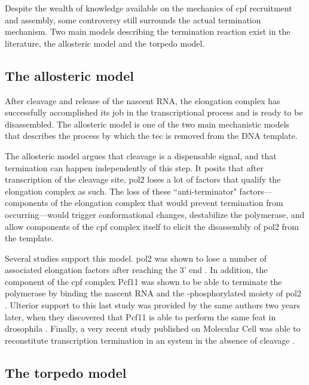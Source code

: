 Despite the wealth of knowledge available on the mechanics of \gls{cpf} recruitment and assembly, some controversy still surrounds the actual termination mechanism.
Two main models describing the termination reaction exist in the literature, the allosteric model and the torpedo model.

\subsection{The allosteric model}

After cleavage and release of the nascent RNA, the elongation complex has successfully accomplished its job in the transcriptional process and is ready to be disassembled.
The allosteric model is one of the two main mechanistic models that describes the process by which the \gls{tec} is removed from the DNA template.

The allosteric model argues that cleavage is a dispensable signal, and that termination can happen independently of this step.
It posits that after transcription of the cleavage site, \gls{pol2} loses a lot of factors that qualify the elongation complex as such.
The loss of these ``anti-terminator" factors---components of the elongation complex that would prevent termination from occurring---would trigger conformational changes, destabilize the polymerase, and allow components of the \gls{cpf} complex itself to elicit the disassembly of \gls{pol2} from the template.

Several studies support this model. 
\gls{pol2} was shown to lose a number of associated elongation factors after reaching the 3' end \citep{kim:2004:transitions}.
In addition, the component of the \gls{cpf} complex Pcf11 was shown to be able to terminate the polymerase \invitro{} by binding the nascent RNA and the \sert{}-phosphorylated moiety of \gls{pol2} \citep{zhang:2005:ctddependent}.
Ulterior support to this last study was provided by the same authors two years later, when they discovered that Pcf11 is able to perform the same feat in drosophila \citep{zhang:2006:pcf11}.
Finally, a very recent study published on Molecular Cell was able to reconstitute transcription termination in an \invitro{} system in the absence of cleavage \citep{zhang:2015:polya}.

\subsection{The torpedo model}



